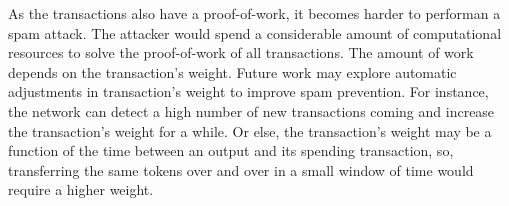 As the transactions also have a proof-of-work, it becomes harder to performan a spam attack. The attacker would spend a considerable amount of computational resources to solve the proof-of-work of all transactions. The amount of work depends on the transaction's weight. Future work may explore automatic adjustments in transaction's weight to improve spam prevention. For instance, the network can detect a high number of new transactions coming and increase the transaction's weight for a while. Or else, the transaction's weight may be a function of the time between an output and its spending transaction, so, transferring the same tokens over and over in a small window of time would require a higher weight.












